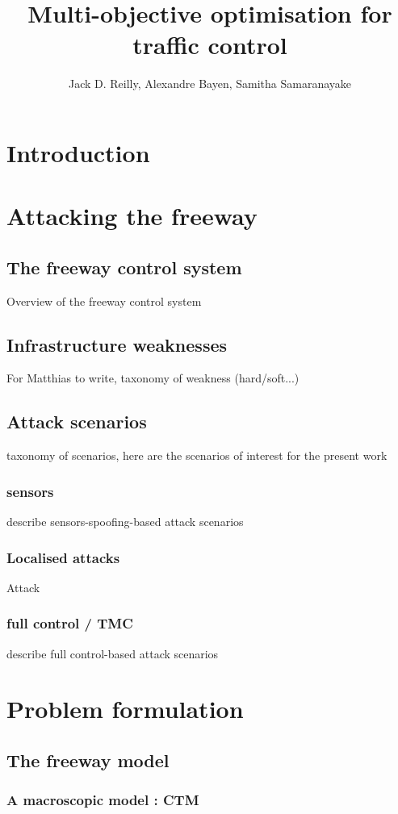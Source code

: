 \documentclass{article}
\title{Multi-objective optimisation for traffic control}
\author{Jack D. Reilly, Alexandre Bayen, Samitha Samaranayake}
\date{}							%
\begin{document}
\maketitle
\tableofcontents

\section*{Introduction}
\section{Attacking the freeway}
	\subsection{The freeway control system}
		Overview of the freeway control system
	\subsection{Infrastructure weaknesses}
		For Matthias to write, taxonomy of weakness (hard/soft...)
	\subsection{Attack scenarios}
		taxonomy of scenarios, here are the scenarios of interest for the present work
		\subsubsection{sensors}
			describe sensors-spoofing-based attack scenarios
		\subsubsection{Localised attacks}
			Attack
		\subsubsection{full control / TMC}
			describe full control-based attack scenarios
\section{Problem formulation}			
	\subsection{The freeway model}
		\subsubsection{A macroscopic model : CTM}
\end{document}
